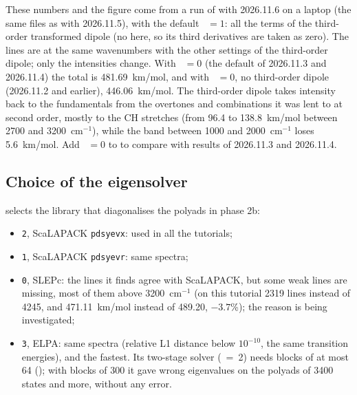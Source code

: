 These numbers and the figure come from a run of  with
2026.11.6 on a laptop (the same files as with 2026.11.5), with the default ~$=1$: all the terms
of the third-order transformed dipole (no  here, so its
third derivatives are taken as zero). The lines are at the same
wavenumbers with the other settings of the third-order dipole; only the
intensities change. With ~$=0$ (the default of 2026.11.3
and 2026.11.4) the total is 481.69~km/mol, and with
~$=0$, no third-order dipole (2026.11.2 and earlier),
446.06~km/mol. The third-order dipole takes intensity back to the
fundamentals from the overtones and combinations it was lent to at
second order, mostly to the CH stretches (from 96.4 to 138.8~km/mol
between 2700 and 3200~cm$^{-1}$), while the band between 1000 and
2000~cm$^{-1}$ loses 5.6~km/mol. Add ~$=0$ to  to
compare with results of 2026.11.3 and 2026.11.4.

\subsection*{Choice of the eigensolver}

 selects the library that diagonalises the polyads in
phase 2b:
\begin{itemize}
\item \texttt{2}, ScaLAPACK \texttt{pdsyevx}: used in all the tutorials;
\item \texttt{1}, ScaLAPACK \texttt{pdsyevr}: same spectra;
\item \texttt{0}, SLEPc: the lines it finds agree with ScaLAPACK, but
  some weak lines are missing, most of them above 3200~cm$^{-1}$ (on this
  tutorial 2319 lines instead of 4245, and 471.11~km/mol instead of
  489.20, $-3.7$\%); the reason is being investigated;
\item \texttt{3}, ELPA: same spectra (relative L1 distance below
  $10^{-10}$, the same transition energies), and the fastest. Its two-stage
  solver (~=~2) needs blocks of at most 64
  (); with blocks of 300 it gave wrong eigenvalues on the
  polyads of 3400 states and more, without any error.
\end{itemize}

